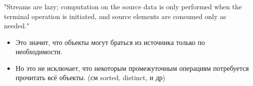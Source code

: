 \begin{frame}[noframenumbering]
\frametitle{\insertsection} 
\framesubtitle{\insertsubsection}
"Streams are lazy; computation on the source data is only performed when the terminal operation is initiated, and source elements are consumed only as needed."
\begin{itemize}
	\item Это значит, что объекты могут браться из источника только по необходимости. %
	\item Но это не исключает, что некоторым промежуточным операциям потребуется прочитать всё объекты. (см sorted, distinct, и др)
\end{itemize}

\end{frame}